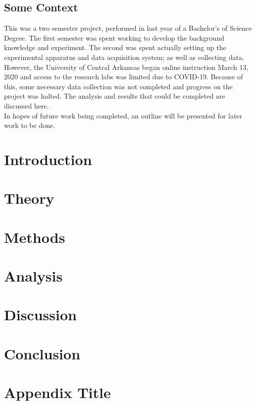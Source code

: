 \documentclass[letterpaper, 12pt]{report}
\begin{document}


\clearpage
\section{Some Context}
This was a two semester project, performed in last year of a Bachelor's of Science Degree. The first semester was spent working to develop the background knowledge and experiment. The second was spent actually setting up the experimental apparatus and data acquisition system; as well as collecting data. However, the University of Central Arkansas began online instruction March 13, 2020 and access to the research labs was limited due to COVID-19. Because of this, some necessary data collection was not completed and progress on the project was halted. The analysis and results that could be completed are discussed here. \\
In hopes of future work being completed, an outline will be presented for later work to be done.

\tableofcontents
\printnomenclature[0.5in]

\chapter{Introduction}\label{chap:Introduction}


\chapter{Theory}\label{chap:Theory}


\chapter{Methods}\label{chap:Methods}


\chapter{Analysis}\label{chap:Analysis}


\chapter{Discussion}\label{chap:Discussion}


\chapter{Conclusion}\label{chap:Conclusion}





\appendix
\chapter{Appendix Title}\label{chap:Appendix}

\end{document}

